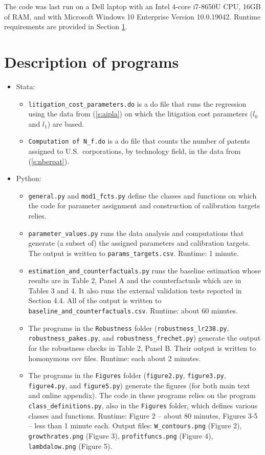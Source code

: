 \documentclass[a4paper,11pt]{article}
\begin{document}
The code was last run on a Dell laptop with an Intel 4-core i7-8650U CPU, 16GB of RAM, and with Microsoft Windows 10 Enterprise Version 10.0.19042. Runtime requirements are provided in Section \ref{sec:programs}.

\section{Description of programs} \label{sec:programs}

\begin{itemize}
  \item Stata:
  \begin{itemize}
    \item \texttt{litigation_cost_parameters.do} is a do file that runs the regression using the data from (\ref{s:aipla}) on which the litigation cost parameters ($l_0$ and $l_1$) are based.
    \item \texttt{Computation of N_f.do} is a do file that counts the number of patents assigned to U.S.~corporations, by technology field, in the data from (\ref{s:nberpat}).
  \end{itemize}
  \item Python:
  \begin{itemize}
    \item \texttt{general.py} and \texttt{mod1_fcts.py} define the classes and functions on which the code for parameter assignment and construction of calibration targets relies.
    \item \texttt{parameter_values.py} runs the data analysis and computations that generate (a subset of) the assigned parameters and calibration targets. The output is written to \texttt{params_targets.csv}. Runtime: 1 minute.
    \item \texttt{estimation_and_counterfactuals.py} runs the baseline estimation whose results are in Table 2, Panel A and the counterfactuals which are in Tables 3 and 4. It also runs the external validation tests reported in Section 4.4. All of the output is written to \texttt{baseline_and_counterfactuals.csv}. Runtime: about 60 minutes.
    \item The programs in the \texttt{Robustness} folder (\texttt{robustness_lr238.py}, \texttt{robustness_pakes.py}, and \texttt{robustness_frechet.py}) generate the output for the robustness checks in Table 2, Panel B. Their output is written to homonymous csv files. Runtime: each about 2 minutes.
    \item The programs in the \texttt{Figures} folder (\texttt{figure2.py}, \texttt{figure3.py}, \texttt{figure4.py}, and \texttt{figure5.py}) generate the figures (for both main text and online appendix). The code in these programs relies on the program \texttt{class_definitions.py}, also in the \texttt{Figures} folder, which defines various classes and functions. Runtime: Figure 2 -- about 80 minutes, Figures 3-5 -- less than 1 minute each. Output files: \texttt{W_contours.png} (Figure 2), \texttt{growthrates.png} (Figure 3), \texttt{profitfuncs.png} (Figure 4), \texttt{lambdalow.png} (Figure 5).

\end{itemize}
\end{itemize}
\end{document}
